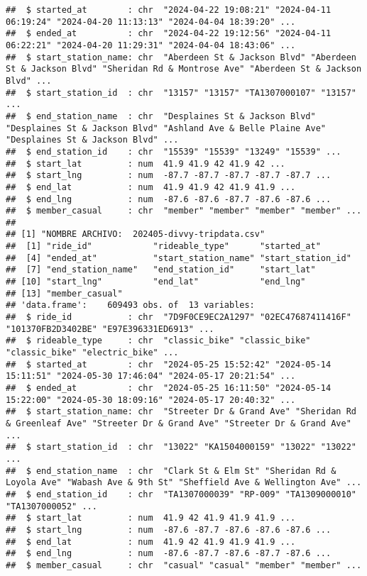 \documentclass[
]{article}
\begin{document}
\begin{verbatim}
##  $ started_at        : chr  "2024-04-22 19:08:21" "2024-04-11 06:19:24" "2024-04-20 11:13:13" "2024-04-04 18:39:20" ...
##  $ ended_at          : chr  "2024-04-22 19:12:56" "2024-04-11 06:22:21" "2024-04-20 11:29:31" "2024-04-04 18:43:06" ...
##  $ start_station_name: chr  "Aberdeen St & Jackson Blvd" "Aberdeen St & Jackson Blvd" "Sheridan Rd & Montrose Ave" "Aberdeen St & Jackson Blvd" ...
##  $ start_station_id  : chr  "13157" "13157" "TA1307000107" "13157" ...
##  $ end_station_name  : chr  "Desplaines St & Jackson Blvd" "Desplaines St & Jackson Blvd" "Ashland Ave & Belle Plaine Ave" "Desplaines St & Jackson Blvd" ...
##  $ end_station_id    : chr  "15539" "15539" "13249" "15539" ...
##  $ start_lat         : num  41.9 41.9 42 41.9 42 ...
##  $ start_lng         : num  -87.7 -87.7 -87.7 -87.7 -87.7 ...
##  $ end_lat           : num  41.9 41.9 42 41.9 41.9 ...
##  $ end_lng           : num  -87.6 -87.6 -87.7 -87.6 -87.6 ...
##  $ member_casual     : chr  "member" "member" "member" "member" ...
## 
## [1] "NOMBRE ARCHIVO:  202405-divvy-tripdata.csv"
##  [1] "ride_id"            "rideable_type"      "started_at"        
##  [4] "ended_at"           "start_station_name" "start_station_id"  
##  [7] "end_station_name"   "end_station_id"     "start_lat"         
## [10] "start_lng"          "end_lat"            "end_lng"           
## [13] "member_casual"     
## 'data.frame':    609493 obs. of  13 variables:
##  $ ride_id           : chr  "7D9F0CE9EC2A1297" "02EC47687411416F" "101370FB2D3402BE" "E97E396331ED6913" ...
##  $ rideable_type     : chr  "classic_bike" "classic_bike" "classic_bike" "electric_bike" ...
##  $ started_at        : chr  "2024-05-25 15:52:42" "2024-05-14 15:11:51" "2024-05-30 17:46:04" "2024-05-17 20:21:54" ...
##  $ ended_at          : chr  "2024-05-25 16:11:50" "2024-05-14 15:22:00" "2024-05-30 18:09:16" "2024-05-17 20:40:32" ...
##  $ start_station_name: chr  "Streeter Dr & Grand Ave" "Sheridan Rd & Greenleaf Ave" "Streeter Dr & Grand Ave" "Streeter Dr & Grand Ave" ...
##  $ start_station_id  : chr  "13022" "KA1504000159" "13022" "13022" ...
##  $ end_station_name  : chr  "Clark St & Elm St" "Sheridan Rd & Loyola Ave" "Wabash Ave & 9th St" "Sheffield Ave & Wellington Ave" ...
##  $ end_station_id    : chr  "TA1307000039" "RP-009" "TA1309000010" "TA1307000052" ...
##  $ start_lat         : num  41.9 42 41.9 41.9 41.9 ...
##  $ start_lng         : num  -87.6 -87.7 -87.6 -87.6 -87.6 ...
##  $ end_lat           : num  41.9 42 41.9 41.9 41.9 ...
##  $ end_lng           : num  -87.6 -87.7 -87.6 -87.7 -87.6 ...
##  $ member_casual     : chr  "casual" "casual" "member" "member" ...

\end{verbatim}
\end{document}
